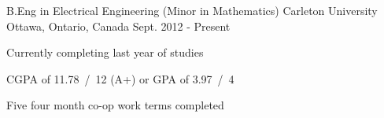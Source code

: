 

\begin{cventries}

  \cventry
    {B.Eng in Electrical Engineering (Minor in Mathematics)} %
    {Carleton University} %
    {Ottawa, Ontario, Canada} %
    {Sept. 2012 - Present} %
    {
      \begin{cvitems} %
        \item {Currently completing last year of studies}
        \item {CGPA of 11.78~/~12 (A+) or GPA of 3.97~/~4}
        \item {Five four month co-op work terms completed}
      \end{cvitems}
    }

\end{cventries}
